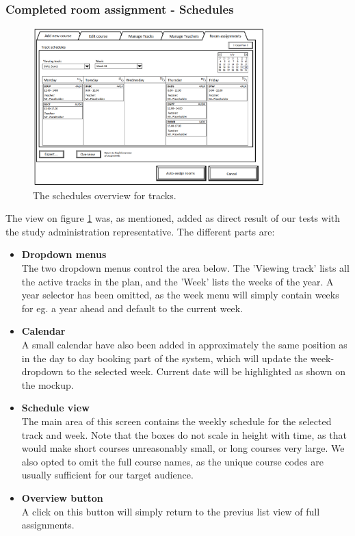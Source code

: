 \subsubsection{Completed room assignment - Schedules}
\begin{figure}[htb]
\begin{center}
\leavevmode
\includegraphics[width=0.8\textwidth]{images/courseplan2_Room_Assignments_schedules}
\end{center}
\caption{The schedules overview for tracks.}
\label{fig:courseplan2_assign_sche}
\end{figure}

The view on figure \ref{fig:courseplan2_assign_sche} was, as mentioned, added as direct result of our tests with the study administration representative. The different parts are:
\begin{itemize}
\item \textbf{Dropdown menus} \\
The two dropdown menus control the area below. The 'Viewing track' lists all the active tracks in the plan, and the 'Week' lists the weeks of the year. A year selector has been omitted, as the week menu will simply contain weeks for eg. a year ahead and default to the current week.
\item \textbf{Calendar} \\
A small calendar have also been added in approximately the same position as in the day to day booking part of the system, which will update the week-dropdown to the selected week. Current date will be highlighted as shown on the mockup.
\item \textbf{Schedule view} \\
The main area of this screen contains the weekly schedule for the selected track and week. Note that the boxes do not scale in height with time, as that would make short courses unreasonably small, or long courses very large. We also opted to omit the full course names, as the unique course codes are usually sufficient for our target audience.
\item \textbf{Overview button} \\
A click on this button will simply return to the previus list view of full assignments.
\end{itemize}